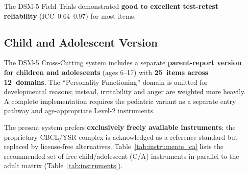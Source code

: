 \documentclass[11pt,a4paper]{article}
\begin{document}
The DSM-5 Field Trials \citep{Narrow2013} demonstrated \textbf{good to excellent test-retest reliability} (ICC~0.64--0.97) for most items.

\subsection{Child and Adolescent Version}
\label{sec:screening_ca}

The DSM-5 Cross-Cutting system includes a separate \textbf{parent-report version for children and adolescents} (ages 6--17) with \textbf{25~items across 12~domains}. The ``Personality Functioning'' domain is omitted for developmental reasons; instead, irritability and anger are weighted more heavily. A complete implementation requires the pediatric variant as a separate entry pathway and age-appropriate Level-2 instruments.

The present system prefers \textbf{exclusively freely available instruments}; the proprietary CBCL/YSR complex \citep{Achenbach2001} is acknowledged as a reference standard but replaced by license-free alternatives. Table~\ref{tab:instrumente_ca} lists the recommended set of free child/adolescent (C/A) instruments in parallel to the adult matrix (Table~\ref{tab:instruments}).
\end{document}
